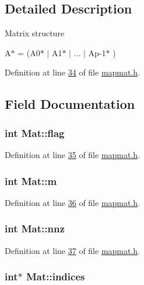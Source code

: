 \subsection{Detailed Description}
Matrix structure \par
 A$\ast$ = (A0$\ast$ $|$ A1$\ast$ $|$ ... $|$ Ap-\/1$\ast$ ) 

Definition at line \hyperlink{mapmat_8h_source_l00034}{34} of file \hyperlink{mapmat_8h_source}{mapmat.\-h}.



\subsection{Field Documentation}
\hypertarget{structMat_a0ab8c39abb15ab5d8d0d990a37dadcc2}{
\subsubsection[{flag}]{\setlength{\rightskip}{0pt plus 5cm}int Mat\-::flag}}\label{structMat_a0ab8c39abb15ab5d8d0d990a37dadcc2}


Definition at line \hyperlink{mapmat_8h_source_l00035}{35} of file \hyperlink{mapmat_8h_source}{mapmat.\-h}.

\hypertarget{structMat_a1656ea8b949ef48d4f0939f675a6d075}{
\subsubsection[{m}]{\setlength{\rightskip}{0pt plus 5cm}int Mat\-::m}}\label{structMat_a1656ea8b949ef48d4f0939f675a6d075}


Definition at line \hyperlink{mapmat_8h_source_l00036}{36} of file \hyperlink{mapmat_8h_source}{mapmat.\-h}.

\hypertarget{structMat_acd6e2a54ef05701b15d794040a3816a6}{
\subsubsection[{nnz}]{\setlength{\rightskip}{0pt plus 5cm}int Mat\-::nnz}}\label{structMat_acd6e2a54ef05701b15d794040a3816a6}


Definition at line \hyperlink{mapmat_8h_source_l00037}{37} of file \hyperlink{mapmat_8h_source}{mapmat.\-h}.

\hypertarget{structMat_a47d869e53879ad1d2b0aed8f6f1f648a}{
\subsubsection[{indices}]{\setlength{\rightskip}{0pt plus 5cm}int$\ast$ Mat\-::indices}}\label{structMat_a47d869e53879ad1d2b0aed8f6f1f648a}


